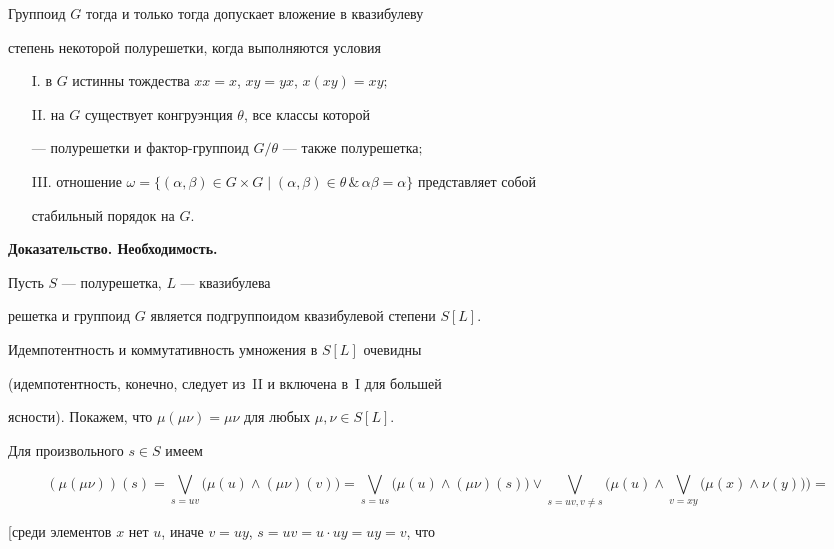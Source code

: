 \begin{thmnonum}


Группоид $G$ тогда и только тогда допускает вложение в квазибулеву


степень некоторой полурешетки, когда выполняются условия


\begin{itemize}


\item[I.] в $G$ истинны тождества $xx=x$, $xy=yx$, $x(xy)=xy;$


\item[II.] на $G$ существует конгруэнция  $\theta$, все классы которой


--- полурешетки и фактор-группоид $G/\theta$ --- также полурешетка$;$


\item[III.] отношение $\omega=\{(\alpha,\beta)\in G\times G\mid


(\alpha,\beta)\in \theta\,\&\,\alpha\beta=\alpha\}$ представляет собой


стабильный порядок на $G$.


\end{itemize}


\end{thmnonum}





{\bf Доказательство. Необходимость.}


Пусть $S$ --- полурешетка, $L$ --- квазибулева


решетка и группоид $G$ является подгруппоидом квазибулевой степени $S[L]$.


Идемпотентность и коммутативность умножения в $S[L]$ очевидны


(идемпотентность, конечно, следует из~II и включена в~I для большей


ясности). Покажем, что $\mu(\mu\nu)=\mu\nu$ для любых $\mu,\nu\in S[L]$.


Для произвольного $s\in S$ имеем


$$


(\mu(\mu\nu))(s)=\bigvee_{s=uv}\big(\mu(u)\wedge(\mu\nu)(v)\big)=


\bigvee_{s=us}\big(\mu(u)\wedge(\mu\nu)(s)\big)\vee


\bigvee_{s=uv,v\ne s}


\bigg(\mu(u)\wedge\bigvee_{v=xy}\big(\mu(x)\wedge\nu(y)\big)\bigg)=


$$


[среди элементов $x$ нет $u$, иначе $v=uy$, $s=uv=u\cdot uy=uy=v$, что


